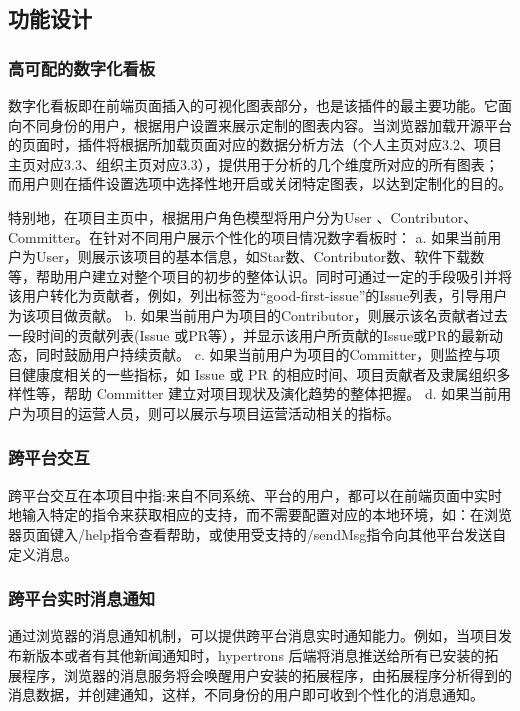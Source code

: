 \subsection{功能设计}
\subsubsection{高可配的数字化看板}
\par 数字化看板即在前端页面插入的可视化图表部分，也是该插件的最主要功能。它面向不同身份的用户，根据用户设置来展示定制的图表内容。当浏览器加载开源平台的页面时，插件将根据所加载页面对应的数据分析方法（个人主页对应3.2、项目主页对应3.3、组织主页对应3.3），提供用于分析的几个维度所对应的所有图表；而用户则在插件设置选项中选择性地开启或关闭特定图表，以达到定制化的目的。
\par 特别地，在项目主页中，根据用户角色模型将用户分为User 、Contributor、Committer。在针对不同用户展示个性化的项目情况数字看板时：
a.	如果当前用户为User，则展示该项目的基本信息，如Star数、Contributor数、软件下载数等，帮助用户建立对整个项目的初步的整体认识。同时可通过一定的手段吸引并将该用户转化为贡献者，例如，列出标签为“good-first-issue”的Issue列表，引导用户为该项目做贡献。
b.	如果当前用户为项目的Contributor，则展示该名贡献者过去一段时间的贡献列表(Issue 或PR等），并显示该用户所贡献的Issue或PR的最新动态，同时鼓励用户持续贡献。
c.	如果当前用户为项目的Committer，则监控与项目健康度相关的一些指标，如 Issue 或 PR 的相应时间、项目贡献者及隶属组织多样性等，帮助 Committer 建立对项目现状及演化趋势的整体把握。
d.	如果当前用户为项目的运营人员，则可以展示与项目运营活动相关的指标。


\subsubsection{跨平台交互}
\par 跨平台交互在本项目中指:来自不同系统、平台的用户，都可以在前端页面中实时地输入特定的指令来获取相应的支持，而不需要配置对应的本地环境，如：在浏览器页面键入/help指令查看帮助，或使用受支持的/sendMsg指令向其他平台发送自定义消息。

\subsubsection{跨平台实时消息通知}
\par 通过浏览器的消息通知机制，可以提供跨平台消息实时通知能力。例如，当项目发布新版本或者有其他新闻通知时，hypertrons 后端将消息推送给所有已安装的拓展程序，浏览器的消息服务将会唤醒用户安装的拓展程序，由拓展程序分析得到的消息数据，并创建通知，这样，不同身份的用户即可收到个性化的消息通知。

